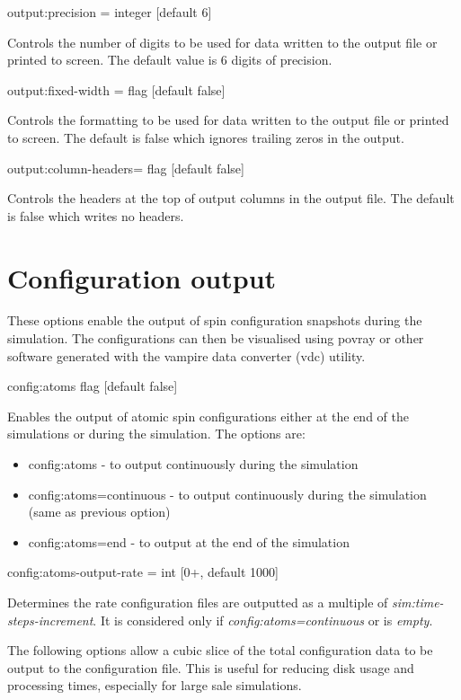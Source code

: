 {\zicf output:precision = integer [default 6]} Controls the number of digits to be used for data written to the output file or printed to screen. The default value is 6 digits of precision.

{\zicf output:fixed-width = flag [default false]} Controls the formatting to be used for data written to the output file or printed to screen. The default is false which ignores trailing zeros in the output.

{\zicf output:column-headers= flag [default false]} Controls the headers at the top of output columns in the output file. The default is false which writes no headers.

\section*{Configuration output}
 These options enable the output of spin configuration snapshots during the simulation. The configurations can then be visualised using povray or other software generated with the vampire data converter (vdc) utility.

{\zicf config:atoms flag [default false]} Enables the output of atomic spin configurations either at the end of the simulations or during the simulation. The options are:

\begin{itemize}
  \item[] config:atoms - to output continuously during the simulation
  \item[] config:atoms=continuous - to output continuously during the simulation (same as previous option)
  \item[] config:atoms=end - to output at the end of the simulation
\end{itemize}

{\zicf config:atoms-output-rate = int [0+, default 1000]} Determines the rate configuration files are outputted as a multiple of \textit{sim:time-steps-increment}. It is considered only if \textit{config:atoms=continuous} or is \textit{empty}.

The following options allow a cubic slice of the total configuration data to be output to the configuration file. This is useful for reducing disk usage and processing times, especially for large sale simulations.

